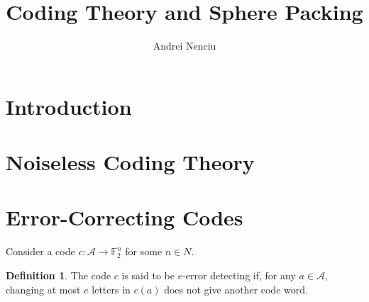 \documentclass[11pt,a4paper]{article}
\title{Coding Theory and Sphere Packing}
\author{Andrei Nenciu}
\newcommand{\bin}{\mathbb{F}_2}
\newcommand{\A}{\mathcal{A}}
\theoremstyle{plain}
\theoremstyle{definition}
\newtheorem{definition}[theorem]{Definition}
\theoremstyle{remark}
\begin{document}
\maketitle

\section{Introduction}

\section{Noiseless Coding Theory}

\section{Error-Correcting Codes}

Consider a code \( c : \A 	\to \bin^n \) for some \( n \in N \). 
\begin{definition}
        The code \( c \) is said to be \( e \)-error detecting if, for any \( a \in \A \), changing at most \( e \) letters in \( c\left(a\right) \) does not give another code word.
\end{definition}
\end{document}
